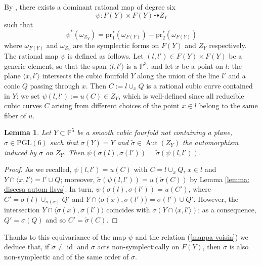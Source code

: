 \documentclass{amsart}
\newtheorem{lemma}[theorem]{Lemma}
\theoremstyle{definition}
\newcommand{\coloneqq}{:=}
\DeclareMathOperator{\id}{id}
\DeclareMathOperator{\aut}{Aut}
\begin{document}
By \cite[Proposition 4.8]{voisin}, there exists a dominant rational map of degree six
\[ \psi: F(Y) \times F(Y) \dashrightarrow Z_Y\]
\noindent such that
\begin{equation} \label{mappa voisin}
\psi^* (\omega_{Z_Y}) = \textrm{pr}_1^* (\omega_{F(Y)}) - \textrm{pr}_2^* (\omega_{F(Y)}) 
\end{equation}
\noindent where $\omega_{F(Y)}$ and $\omega_{Z_Y}$ are the symplectic forms on $F(Y)$ and $Z_Y$ respectively. The rational map $\psi$ is defined as follows. Let $(l,l') \in F(Y)\times F(Y)$ be a generic element, so that the span $\langle l,l' \rangle$ is a $\mathbb{P}^3$, and let $x$ be a point on $l$: the plane $\langle x, l' \rangle$ intersects the cubic fourfold $Y$ along the union of the line $l'$ and a conic $Q$ passing through $x$. Then $C \coloneqq l \cup_x Q$ is a rational cubic curve contained in $Y$: we set $\psi(l,l') \coloneqq u(C) \in Z_Y$, which is well-defined since all reducible cubic curves $C$ arising from different choices of the point $x \in l$ belong to the same fiber of $u$.

\begin{lemma}
 Let $Y \subset \mathbb{P}^5$ be a smooth cubic fourfold not containing a plane, \mbox{$\sigma \in \mathrm{PGL}(6)$} such that $\sigma(Y) = Y$ and $\tilde{\sigma} \in \aut(Z_Y)$ the automorphism induced by $\sigma$ on $Z_Y$. Then $\psi\left(\sigma(l), \sigma(l')\right) = \tilde{\sigma}\left( \psi(l,l') \right)$. 
\end{lemma}

\begin{proof}
As we recalled, $\psi(l,l') = u(C)$ with $C = l \cup_x Q$, $x \in l$ and $Y \cap \langle x,l' \rangle = l' \cup Q$; moreover, $\tilde{\sigma}\left( \psi(l,l') \right) = u \left( \check{\sigma}(C) \right)$ by Lemma \ref{lemma: discesa autom llsvs}. In turn, $\psi\left(\sigma(l), \sigma(l')\right) = u(C')$, where $C' = \sigma(l) \cup_{\sigma(x)} Q'$ and $Y \cap \langle \sigma(x), \sigma(l') \rangle = \sigma(l') \cup Q'$. However, the intersection $Y \cap \langle \sigma(x), \sigma(l') \rangle$ coincides with $\sigma \left( Y \cap \langle x, l' \rangle\right)$; as a consequence, $Q' = \sigma(Q)$ and so $C' = \check{\sigma}(C)$.
\end{proof}

Thanks to this equivariance of the map $\psi$ and the relation (\ref{mappa voisin}) we deduce that, if $\tilde{\sigma} \neq \id $ and $\sigma$ acts non-symplectically on $F(Y)$, then $\tilde{\sigma}$ is also non-symplectic and of the same order of $\sigma$.
\end{document}
